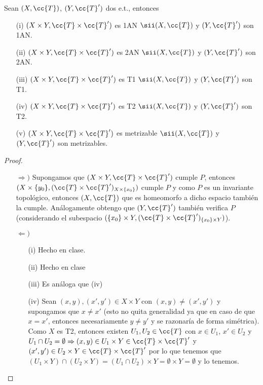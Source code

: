 \begin{prop}
    Sean $(X, \cc{T})$, $(Y, \cc{T}')$ dos e.t., entonces
    \begin{enumerate}
        \item[(i)] $(X\times Y, \cc{T}\times \cc{T}')$ es 1AN $\sii (X, \cc{T})$ y $(Y, \cc{T}')$ son 1AN.
        \item[(ii)] $(X\times Y, \cc{T}\times \cc{T}')$ es 2AN $\sii (X, \cc{T})$ y $(Y, \cc{T}')$ son 2AN.
        \item[(iii)] $(X\times Y, \cc{T}\times \cc{T}')$ es T1 $\sii (X, \cc{T})$ y $(Y, \cc{T}')$ son T1. 
        \item[(iv)] $(X\times Y, \cc{T}\times \cc{T}')$ es T2 $\sii (X, \cc{T})$ y $(Y, \cc{T}')$ son T2.
        \item[(v)] $(X\times Y, \cc{T}\times \cc{T}')$ es metrizable $\sii (X, \cc{T})$ y $(Y, \cc{T}')$ son metrizables.
    \end{enumerate}
    \begin{proof}\
        \begin{itemize}
            \item[$\Rightarrow)$] Supongamos que $(X\times Y, \cc{T}\times \cc{T}')$ cumple $P$, entonces $(X\times\{y_0\}, (\cc{T}\times \cc{T}')_{X\times\{x_0\}})$ cumple $P$ y como $P$ es un invariante topológico, entonces $(X, \cc{T})$ que es homeomorfo a dicho espacio también la cumple. Análogamente obtengo que $(Y, \cc{T}')$ también verifica $P$ (considerando el subespacio $(\{x_0\}\times Y, (\cc{T}\times \cc{T}')_{\{x_0\}\times Y})$).
            \item[$\Leftarrow)$] 
            \begin{itemize}
                \item[(i)] Hecho en clase.
                \item[(ii)] Hecho en clase
                \item[(iii)] Es análoga que (iv)
                \item[(iv)] Sean $(x,y), (x', y')\in X\times Y$ con $(x,y)\neq (x',y')$ y supongamos que $x\neq x'$ (esto no quita generalidad ya que en caso de que $x=x'$, entonces necesariamente $y\neq y'$ y se razonaría de forma simétrica). Como $X$ es T2, entonces existen $U_1, U_2\in \cc{T}$ con $x\in U_1$, $x'\in U_2$ y $U_1 \cap U_2 = \emptyset \Rightarrow (x,y)\in U_1 \times Y \in \cc{T}\times \cc{T}'$ y $(x',y')\in U_2 \times Y\in \cc{T}\times \cc{T}'$ por lo que tenemos que $(U_1\times Y)\cap (U_2\times Y) = (U_1 \cap U_2)\times Y = \emptyset \times Y = \emptyset$ y lo tenemos.

\end{itemize}
\end{itemize}
\end{proof}
\end{prop}
